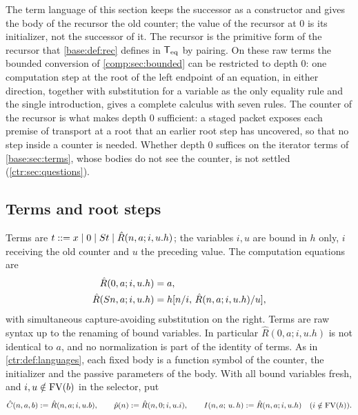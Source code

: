 The term language of this section keeps the successor as a constructor and gives the body of
the recursor the old counter; the value of the recursor at $0$ is its initializer, not the
successor of it. The recursor is the primitive form of the recursor that \cref{base:def:rec}
defines in $\mathsf{T}_{\mathrm{eq}}$ by pairing. On these raw terms the bounded conversion of
\cref{comp:sec:bounded} can be restricted to depth $0$: one computation step at the root of the
left endpoint of an equation, in either direction, together with substitution for a variable
as the only equality rule and the single introduction, gives a complete calculus with seven
rules. The counter of the recursor is what makes depth $0$ sufficient: a staged packet exposes
each premise of transport at a root that an earlier root step has uncovered, so that no step
inside a counter is needed. Whether depth $0$ suffices on the iterator terms of
\cref{base:sec:terms}, whose bodies do not see the counter, is not settled
(\cref{ctr:sec:questions}).

\subsection{Terms and root steps}

\begin{definition}\label{ctr:def:rhterms}
Terms are $t ::= x\mid 0\mid S t\mid \hat R(n,a;i,u.h)$; the variables $i,u$ are bound in
$h$ only, $i$ receiving the old counter and $u$ the preceding value. The computation equations
are
\begin{align}
 \hat R(0,a;i,u.h)&=a, \label{ctr:eq:rhzero}\\
 \hat R(S n,a;i,u.h)&=h[n/i,\,\hat R(n,a;i,u.h)/u], \label{ctr:eq:rhsucc}
\end{align}
with simultaneous capture-avoiding substitution on the right. Terms are raw syntax up to the
renaming of bound variables. In particular $\hat R(0,a;i,u.h)$ is not identical to $a$, and no
normalization is part of the identity of terms. As in \cref{ctr:def:languages}, each fixed body
is a function symbol of the counter, the initializer and the passive parameters of the body.
With all bound variables fresh, and $i,u\notin\operatorname{FV}(b)$ in the selector, put
\begin{equation}\label{ctr:eq:rhabbrev}
 \hat C(n,a,b)\mathrel{:=}\hat R(n,a;i,u.b),\qquad
 \hat p(n)\mathrel{:=}\hat R(n,0;i,u.i),\qquad
 I(n,a;\,u.\,h)\mathrel{:=}\hat R(n,a;i,u.h)\quad(i\notin\operatorname{FV}(h)).
\end{equation}
\end{definition}

